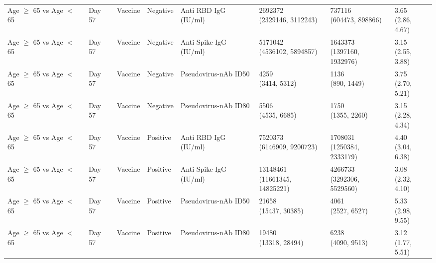 \documentclass[]{book}
\theoremstyle{definition}
\theoremstyle{definition}
\theoremstyle{definition}
\newcommand{\1}{\mathbbm{1}}
\begin{document}
\begin{landscape}
\begin{ThreePartTable}
\begin{longtable}[t]{>{\raggedright\arraybackslash}p{2.7cm}lllllll}
Age $\geq$ 65 vs Age $<$ 65 & Day 57 & Vaccine & Negative & Anti RBD IgG (IU/ml) & \makecell[l]{2692372\\(2329146, 3112243)} & \makecell[l]{737116\\(604473, 898866)} & \makecell[l]{3.65\\(2.86, 4.67)}\\
Age $\geq$ 65 vs Age $<$ 65 & Day 57 & Vaccine & Negative & Anti Spike IgG (IU/ml) & \makecell[l]{5171042\\(4536102, 5894857)} & \makecell[l]{1643373\\(1397160, 1932976)} & \makecell[l]{3.15\\(2.55, 3.88)}\\
Age $\geq$ 65 vs Age $<$ 65 & Day 57 & Vaccine & Negative & Pseudovirus-nAb ID50 & \makecell[l]{4259\\(3414, 5312)} & \makecell[l]{1136\\(890, 1449)} & \makecell[l]{3.75\\(2.70, 5.21)}\\
\addlinespace
Age $\geq$ 65 vs Age $<$ 65 & Day 57 & Vaccine & Negative & Pseudovirus-nAb ID80 & \makecell[l]{5506\\(4535, 6685)} & \makecell[l]{1750\\(1355, 2260)} & \makecell[l]{3.15\\(2.28, 4.34)}\\
Age $\geq$ 65 vs Age $<$ 65 & Day 57 & Vaccine & Positive & Anti RBD IgG (IU/ml) & \makecell[l]{7520373\\(6146909, 9200723)} & \makecell[l]{1708031\\(1250384, 2333179)} & \makecell[l]{4.40\\(3.04, 6.38)}\\
Age $\geq$ 65 vs Age $<$ 65 & Day 57 & Vaccine & Positive & Anti Spike IgG (IU/ml) & \makecell[l]{13148461\\(11661345, 14825221)} & \makecell[l]{4266733\\(3292306, 5529560)} & \makecell[l]{3.08\\(2.32, 4.10)}\\
Age $\geq$ 65 vs Age $<$ 65 & Day 57 & Vaccine & Positive & Pseudovirus-nAb ID50 & \makecell[l]{21658\\(15437, 30385)} & \makecell[l]{4061\\(2527, 6527)} & \makecell[l]{5.33\\(2.98, 9.55)}\\
Age $\geq$ 65 vs Age $<$ 65 & Day 57 & Vaccine & Positive & Pseudovirus-nAb ID80 & \makecell[l]{19480\\(13318, 28494)} & \makecell[l]{6238\\(4090, 9513)} & \makecell[l]{3.12\\(1.77, 5.51)}\\

\end{longtable}
\end{ThreePartTable}
\end{landscape}
\end{document}
